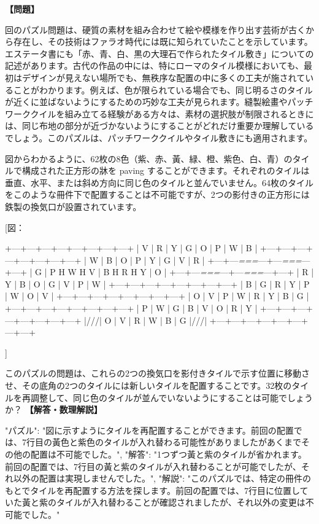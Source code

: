 \documentclass[10pt,a4paper,oneside,openany]{ltjsbook}
\begin{document}
\begin{tcolorbox}[colback=softblue,colframe=primaryblue,title=\textbf{第 302 問：A PROBLEM IN MOSAICS.},arc=2mm,boxrule=1pt,breakable]
\textbf{【問題】}\par\vspace{0.3em}
回のパズル問題は、硬質の素材を組み合わせて絵や模様を作り出す芸術が古くから存在し、その技術はファラオ時代には既に知られていたことを示しています。エステータ書にも「赤、青、白、黒の大理石で作られたタイル敷き」についての記述があります。古代の作品の中には、特にローマのタイル模様においても、最初はデザインが見えない場所でも、無秩序な配置の中に多くの工夫が施されていることがわかります。例えば、色が限られている場合でも、同じ明るさのタイルが近くに並ばないようにするための巧妙な工夫が見られます。縫製絵畫やパッチワーククイルを組み立てる経験がある方々は、素材の選択肢が制限されるときには、同じ布地の部分が近づかないようにすることがどれだけ重要か理解しているでしょう。このパズルは、パッチワーククイルやタイル敷きにも適用されます。

図からわかるように、62枚の8色（紫、赤、黃、緑、橙、紫色、白、青）のタイルで構成された正方形の牀を paving することができます。それぞれのタイルは垂直、水平、または斜め方向に同じ色のタイルと並んでいません。64枚のタイルをこのような冊件下で配置することは不可能ですが、2つの影付きの正方形には鉄製の換気口が設置されています。

[図：

    +---+---+---+---+---+---+---+---+
    | V | R | Y | G | O | P | W | B |
    +---+---+---+---+---+---+---+---+
    | W | B | O | P | Y | G | V | R |
    +---+---\textit{===}---+---\textit{===}---+---+
    | G | P H W H V | B H R H Y | O |
    +---+---\textit{===}---+---\textit{===}---+---+
    | R | Y | B | O | G | V | P | W |
    +---+---+---+---+---+---+---+---+
    | B | G | R | Y | P | W | O | V |
    +---+---+---+---+---+---+---+---+
    | O | V | P | W | R | Y | B | G |
    +---+---+---+---+---+---+---+---+
    | P | W | G | B | V | O | R | Y |
    +---+---+---+---+---+---+---+---+
    |///| O | V | R | W | B | G |///|
    +---+---+---+---+---+---+---+---+

]

このパズルの問題は、これらの2つの換気口を影付きタイルで示す位置に移動させ、その底角の2つのタイルには新しいタイルを配置することです。32枚のタイルを再調整して、同じ色のタイルが並んでいないようにすることは可能でしょうか？
\tcblower
\textbf{【解答・数理解説】}\par\vspace{0.3em}
{
"パズル": "図に示すようにタイルを再配置することができます。前回の配置では、7行目の黃色と紫色のタイルが入れ替わる可能性がありましたがあくまでその他の配置は不可能でした。",
"解答": "1つずつ黃と紫のタイルが省かれます。前回の配置では、7行目の黃と紫のタイルが入れ替わることが可能でしたが、それ以外の配置は実現しませんでした。",
"解説": "このパズルでは、特定の冊件のもとでタイルを再配置する方法を探します。前回の配置では、7行目に位置していた黃と紫のタイルが入れ替わることが確認されましたが、それ以外の変更は不可能でした。"
}
\end{tcolorbox}
\end{document}
